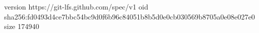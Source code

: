 version https://git-lfs.github.com/spec/v1
oid sha256:fd0493d4ce7bbc54bc9d0f6b96c84051b8b5d0e0cb030569b8705a0e08e027e0
size 174940
